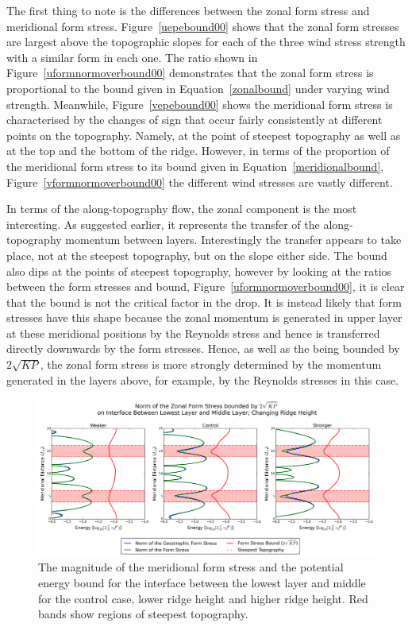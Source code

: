 \documentclass[12pt,a4paper]{report}
\newcommand*\figref[1]{Figure~\ref{#1}}
\newcommand*\equref[1]{Equation~\eqref{#1}}
\begin{document}
The first thing to note is the differences between the zonal form stress and meridional form stress. 
\figref{uepebound00} shows that the zonal form stresses are largest above the topographic slopes
for each of the three wind stress strength with a similar form in each one.
The ratio shown in \figref{uformnormoverbound00} demonstrates that the zonal form stress
is proportional to the bound given in \equref{zonalbound} under
varying wind strength. Meanwhile, \figref{vepebound00} shows the meridional form stress is characterised 
by the changes of sign that occur fairly consistently at
different points on the topography. Namely, at the point of steepest topography as
well as at the top and the bottom of the ridge. However, in terms
of the proportion of the meridional form stress to its bound given in \equref{meridionalbound},
 \figref{vformnormoverbound00} the different wind stresses are vastly different.
 
 In terms of the along-topography
flow, the zonal component is the most interesting. As suggested earlier, it represents
the transfer of the along-topography momentum between layers. Interestingly the
transfer appears to take place, not at the steepest topography, but on the slope either
side. The bound also dips at the points of steepest topography, however by looking
at the ratios between the form stresses and bound, \figref{uformnormoverbound00}, it is clear
that the bound is not the critical factor in the drop. 
It is instead likely that form stresses have this
 shape because the zonal momentum is generated in upper layer at these meridional 
 positions by the Reynolds stress and hence is transferred directly downwards by the form
  stresses. Hence, as well as the being bounded by $2 \sqrt{KP}$, the zonal form stress
  is more strongly determined by the momentum generated in the layers above, for example,
  by the Reynolds stresses in this case.
  
  
  \begin{figure}
  	\centering
  	\includegraphics[width=\linewidth]{uepebound_1_0}
  	\caption{ The magnitude of the meridional form stress and the potential energy bound for the
  		interface between
  		the lowest layer and middle for the control case, lower ridge height and higher ridge height.  Red bands show regions of steepest topography.}
  	\label{uepebound10}
  \end{figure}
  
\end{document}
